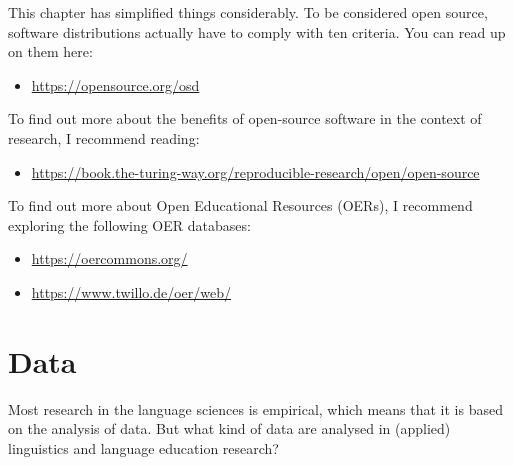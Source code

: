 \documentclass[
  letterpaper,
  DIV=11,
  numbers=noendperiod]{scrreprt}
\providecommand{\tightlist}{%
  \setlength{\itemsep}{0pt}\setlength{\parskip}{0pt}}\usepackage{longtable,booktabs,array}
\begin{document}
\begin{tcolorbox}[enhanced jigsaw, rightrule=.15mm, bottomrule=.15mm, coltitle=black, breakable, toprule=.15mm, colbacktitle=quarto-callout-note-color!10!white, titlerule=0mm, colframe=quarto-callout-note-color-frame, colback=white, arc=.35mm, left=2mm, opacitybacktitle=0.6, opacityback=0, bottomtitle=1mm, leftrule=.75mm, title=\textcolor{quarto-callout-note-color}{\faInfo}\hspace{0.5em}{Tips to go further}, toptitle=1mm]

This chapter has simplified things considerably. To be considered open
source, software distributions actually have to comply with ten
criteria. You can read up on them here:

\begin{itemize}
\tightlist
\item
  \url{https://opensource.org/osd}
\end{itemize}

To find out more about the benefits of open-source software in the
context of research, I recommend reading:

\begin{itemize}
\tightlist
\item
  \url{https://book.the-turing-way.org/reproducible-research/open/open-source}
\end{itemize}

To find out more about Open Educational Resources (OERs), I recommend
exploring the following OER databases:

\begin{itemize}
\item
  \url{https://oercommons.org/}
\item
  \url{https://www.twillo.de/oer/web/}
\end{itemize}

\end{tcolorbox}


\chapter{Data}\label{data}

Most research in the language sciences is empirical, which means that it
is based on the analysis of data. But what kind of data are analysed in
(applied) linguistics and language education research?
\end{document}

